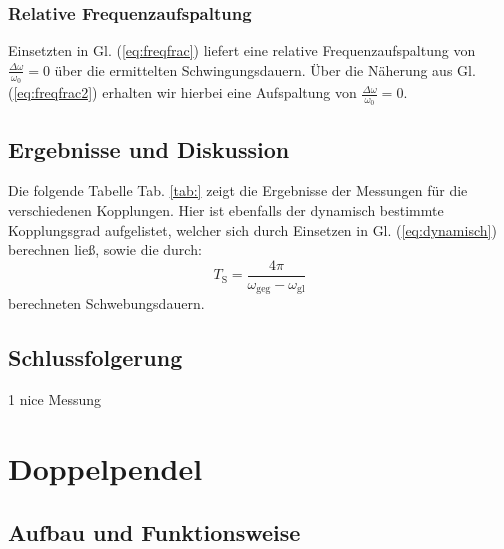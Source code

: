 \documentclass[11pt,a4paper,titlepage, ngerman]{article}
\newcommand{\refeq}[1]{Gl. (\ref{eq:#1})}
\newcommand{\reftab}[1]{Tab. \ref{tab:#1}}
\begin{document}
			\subsubsection{Relative Frequenzaufspaltung}
			
				Einsetzten in \refeq{freqfrac} liefert eine relative Frequenzaufspaltung von $\frac{\Delta\omega}{\omega_0} = 0$ über die ermittelten Schwingungsdauern. Über die Näherung aus \refeq{freqfrac2} erhalten wir hierbei eine Aufspaltung von $\frac{\Delta\omega}{\omega_0} = 0$.
													
			
		\subsection{Ergebnisse und Diskussion}	
			
			Die folgende Tabelle \reftab{} zeigt die Ergebnisse der Messungen für die verschiedenen Kopplungen. Hier ist ebenfalls der dynamisch bestimmte Kopplungsgrad aufgelistet, welcher sich durch Einsetzen in \refeq{dynamisch} berechnen ließ, sowie die durch:
			\begin{equation}
				T_\text{S} = \frac{4\pi}{\omega_\text{geg} - \omega_\text{gl}} 
			\end{equation}
			berechneten Schwebungsdauern.
			
		\subsection{Schlussfolgerung}
			
			1 nice Messung				
			
	\section{Doppelpendel}
	
		\subsection{Aufbau und Funktionsweise}	
			
\end{document}
